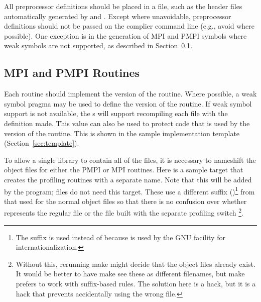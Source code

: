 \documentclass{article}
\begin{document}
All preprocessor definitions should be placed in a file, such as the
header files automatically generated by
 and .  Except
where unavoidable, preprocessor definitions should not be passed on
the complier command line (e.g., avoid  where
possible). One exception is in the generation of MPI and PMPI symbols
where weak symbols are not supported, as described in
Section~\ref{sec:pmpi-routines}. 

\subsection{MPI and PMPI Routines}
\label{sec:pmpi-routines}
Each routine should implement the  version of the routine.
Where possible, a weak symbol pragma may be used to define the
 version of the routine.  If weak symbol support is not
available, the s will support recompiling each file
with the definition  made.  This value
can also be used to protect code that is used by the 
version of the routine.  This is shown in the sample implementation template
(Section~\ref{sec:template}).

To allow a single library to contain all of the files, it is necessary to
nameshift the object files for either the PMPI or MPI routines.  
Here is a sample  target that creates the profiling routines
with a separate name.  Note that this will be added by the 
program;  files do not need this target.
These use a different suffix ()\footnote{The suffix 
is used instead of  
because  is used by the GNU  facility for
internationalization.}
from that used
for the normal object files so that there is no confusion over whether
 represents the regular file or the file built with the separate
profiling switch \footnote{Without this, rerunning
  make might decide that the object files already exist.  It would be better
  to have make see these as different filenames, but make prefers to work with
  suffix-based rules.  The solution here is a hack, but it is a hack that
  prevents accidentally using the wrong file.}.
\end{document}
